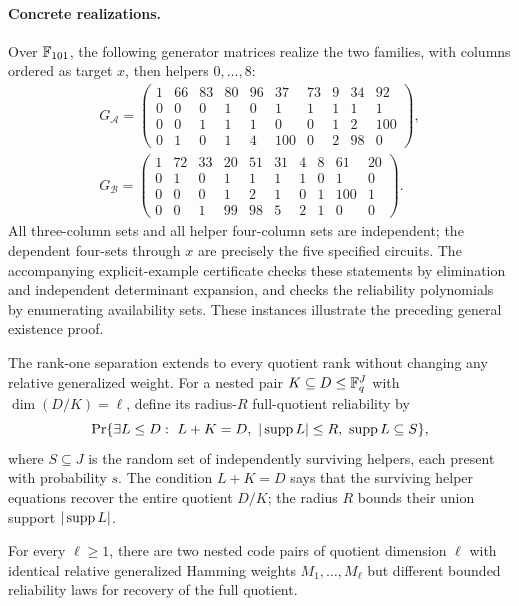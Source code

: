 \paragraph{Concrete realizations.}
Over $\mathbb F_{101}$, the following generator matrices realize the two families,
with columns ordered as target $x$, then helpers $0,\ldots,8$:
\[
\begin{gathered}
G_{\mathcal A}=\begin{pmatrix}
1&66&83&80&96&37&73&9&34&92\\
0&0&0&1&0&1&1&1&1&1\\
0&0&1&1&1&0&0&1&2&100\\
0&1&0&1&4&100&0&2&98&0
\end{pmatrix},\\[4pt]
G_{\mathcal B}=\begin{pmatrix}
1&72&33&20&51&31&4&8&61&20\\
0&1&0&1&1&1&1&0&1&0\\
0&0&0&1&2&1&0&1&100&1\\
0&0&1&99&98&5&2&1&0&0
\end{pmatrix}.
\end{gathered}
\]
All three-column sets and all helper four-column sets are independent;
the dependent four-sets through $x$ are precisely the five specified circuits.
The accompanying explicit-example certificate checks these statements by
elimination and independent determinant expansion, and checks the reliability
polynomials by enumerating availability sets.  These instances illustrate
the preceding general existence proof.%

The rank-one separation extends to every quotient rank without changing any
relative generalized weight.  For a nested pair $K\subseteq D\leq\mathbb F_q^J$
with $\dim(D/K)=\ell$, define its radius-$R$ full-quotient reliability by
\[
 \Pr\{\exists L\leq D:\ L+K=D,\ |\operatorname{supp} L|\leq R,
                     \ \operatorname{supp} L\subseteq S\},
\]
where $S\subseteq J$ is the random set of independently surviving helpers,
each present with probability $s$.
The condition $L+K=D$ says that the surviving helper equations recover the
entire quotient $D/K$; the radius $R$ bounds their union support $|\operatorname{supp} L|$.

\begin{theorem}
\label{thm:rghw-reliability-separation}
%
For every $\ell\geq1$, there are two nested code pairs of quotient dimension
$\ell$ with identical relative generalized Hamming weights
$M_1,\ldots,M_\ell$ but different bounded reliability laws for recovery of
the full quotient.
\end{theorem}

